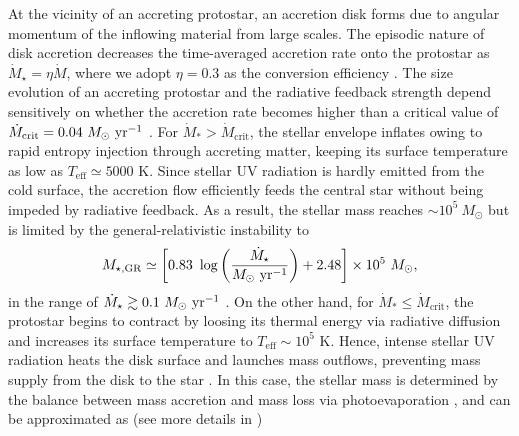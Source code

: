 \documentclass[twocolumn, twocolappendix]{aastex63}
\newcommand{\Msun}{M_\odot}
\newcommand{\Msunyr}{M_\odot~{\rm yr}^{-1}}
\newcommand{\Mdot}{\dot{M}}
\newcommand{\blue}[1]{\textcolor{blue}{ #1}}
\begin{document}
\begin{CJK*}{UTF8}{gbsn}
At the vicinity of an accreting protostar, an accretion disk forms due to angular momentum of the inflowing material from large scales. 
The episodic nature of disk accretion decreases the time-averaged accretion rate onto the protostar as $\Mdot_{\star}=\eta \Mdot$, 
where we adopt $\eta=0.3$ as the conversion efficiency \citep{2016MNRAS.459.1137S, 2022arXiv220614459T}. 
The size evolution of an accreting protostar and the radiative feedback strength depend sensitively on whether
the accretion rate becomes higher than a critical value of $\dot{M}_{\mathrm{crit}}=0.04~\Msunyr$ 
\citep{2001ApJ...561L..55O,2013ApJ...778..178H,2013A&A...558A..59S,2015MNRAS.452..755S,2018MNRAS.474.2757H}.
For $\dot{M}_\ast > \Mdot_\mathrm{crit}$, the stellar envelope inflates owing to rapid entropy injection through accreting matter,
keeping its surface temperature as low as $T_\mathrm{eff} \simeq 5000$ K. 
Since stellar UV radiation is hardly emitted from the cold surface, the accretion flow efficiently feeds the central star without being 
impeded by radiative feedback.
As a result, the stellar mass reaches $\sim 10^5~\Msun$ but is limited by the general-relativistic instability to
%
\begin{equation}
 M_{\star, \mathrm{GR}} \simeq\left[0.83~\log \left(\frac{\dot{M}_{\star}}{\Msunyr}\right)+2.48\right] \times 10^{5} ~\Msun,
\end{equation}
%
in the range of $\dot{M}_\star\gtrsim 0.1~\Msunyr$ \citep{2016PhRvD..94b1501S,2017ApJ...842L...6W,2019PASA...36...27W}.
On the other hand, for $\dot{M}_\ast \leq \Mdot_\mathrm{crit}$, the protostar begins to contract by loosing its thermal energy via radiative diffusion
and increases its surface temperature to $T_\mathrm{eff} \sim 10^5$ K.
Hence, intense stellar UV radiation heats the disk surface and launches mass outflows, preventing mass supply from the disk to the star
\citep{2008ApJ...681..771M,2011Sci...334.1250H}. 
In this case, the stellar mass is determined by the balance between mass accretion and mass loss via photoevaporation \citep{2013ApJ...773..155T},
and can be approximated as (see more details in \citealt{2021ApJ...917...60L})

\end{CJK*}
\end{document}
